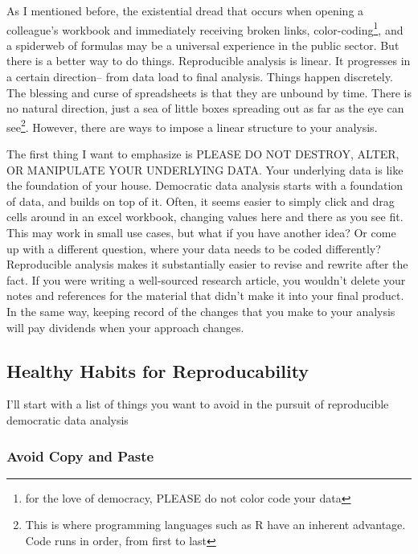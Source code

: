 \documentclass[
]{book}
\begin{document}
As I mentioned before, the existential dread that occurs when opening a colleague's workbook and immediately receiving broken links, color-coding\footnote{for the love of democracy, PLEASE do not color code your data}, and a spiderweb of formulas may be a universal experience in the public sector. But there is a better way to do things. Reproducible analysis is linear. It progresses in a certain direction-- from data load to final analysis. Things happen discretely. The blessing and curse of spreadsheets is that they are unbound by time. There is no natural direction, just a sea of little boxes spreading out as far as the eye can see\footnote{This is where programming languages such as R have an inherent advantage. Code runs in order, from first to last}. However, there are ways to impose a linear structure to your analysis.

The first thing I want to emphasize is PLEASE DO NOT DESTROY, ALTER, OR MANIPULATE YOUR UNDERLYING DATA. Your underlying data is like the foundation of your house. Democratic data analysis starts with a foundation of data, and builds on top of it. Often, it seems easier to simply click and drag cells around in an excel workbook, changing values here and there as you see fit. This may work in small use cases, but what if you have another idea? Or come up with a different question, where your data needs to be coded differently? Reproducible analysis makes it substantially easier to revise and rewrite after the fact. If you were writing a well-sourced research article, you wouldn't delete your notes and references for the material that didn't make it into your final product. In the same way, keeping record of the changes that you make to your analysis will pay dividends when your approach changes.

\hypertarget{healthy-habits-for-reproducability}{%
\subsection{Healthy Habits for Reproducability}\label{healthy-habits-for-reproducability}}

I'll start with a list of things you want to avoid in the pursuit of reproducible democratic data analysis

\hypertarget{avoid-copy-and-paste}{%
\subsubsection{Avoid Copy and Paste}\label{avoid-copy-and-paste}}
\end{document}

